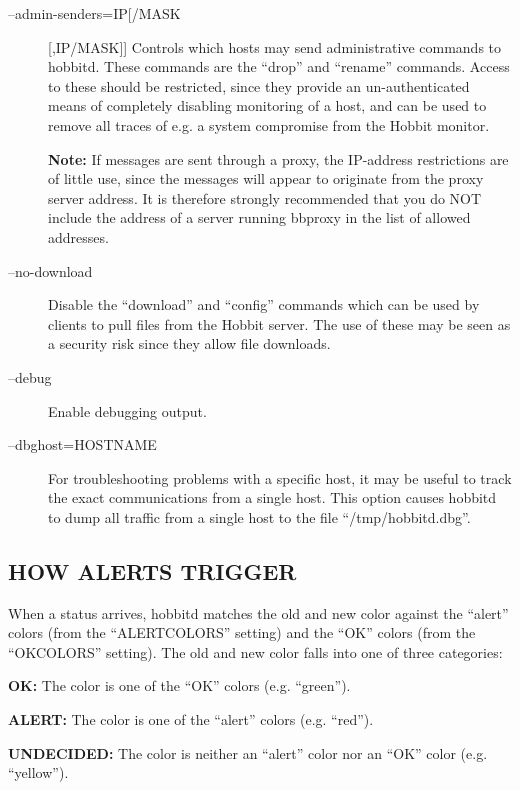 \begin{description}
 

\item[--admin-senders=IP[/MASK][,IP/MASK]] Controls which hosts may send administrative commands to hobbitd. These commands are the ``drop'' and ``rename'' commands. Access to these should be restricted, since they provide an un-authenticated means of completely disabling monitoring of a host, and can be used to remove all traces of e.g. a system compromise from the Hobbit monitor. 

 \textbf{Note:}
 If messages are sent through a proxy, the IP-address restrictions are of little use, since the messages will appear to originate from the proxy server address. It is therefore strongly recommended that you do NOT include the address of a server running bbproxy in the list of allowed addresses. 


 

\item[--no-download] Disable the ``download'' and ``config'' commands which can be used by clients to pull files from the Hobbit server. The use of these may be seen as a security risk since they allow file downloads. 

 

\item[--debug] Enable debugging output. 

 

\item[--dbghost=HOSTNAME] For troubleshooting problems with a specific host, it may be useful to track the exact communications from a single host. This option causes hobbitd to dump all traffic from a single host to the file ``/tmp/hobbitd.dbg''. 

 


\end{description}
\subsection{HOW ALERTS TRIGGER}
 When a status arrives, hobbitd matches the old and new color against the ``alert'' colors (from the ``ALERTCOLORS'' setting) and the ``OK'' colors (from the ``OKCOLORS'' setting). The old and new color falls into one of three categories: 

 \textbf{OK:}
 The color is one of the ``OK'' colors (e.g. ``green''). 


 \textbf{ALERT:}
 The color is one of the ``alert'' colors (e.g. ``red''). 


 \textbf{UNDECIDED:}
 The color is neither an ``alert'' color nor an ``OK'' color (e.g. ``yellow''). 


